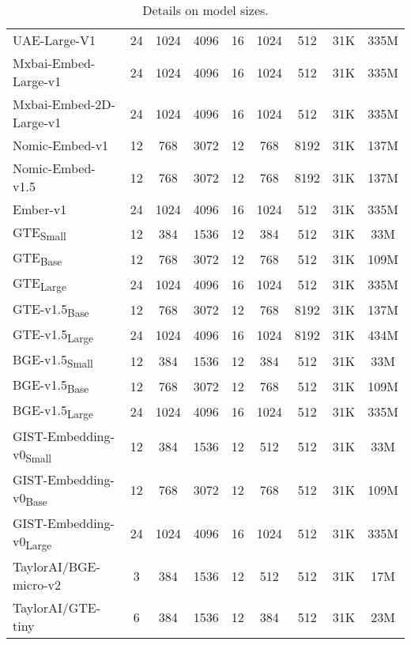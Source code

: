 \begin{table*}[ht!]
\begin{tabular}{lcccccccc}
    UAE-Large-V1 & 24 & 1024 & 4096 & 16 & 1024 & 512 & 31K & 335M \\
    Mxbai-Embed-Large-v1 & 24 & 1024 & 4096 & 16 & 1024 & 512 & 31K & 335M \\
    Mxbai-Embed-2D-Large-v1 & 24 & 1024 & 4096 & 16 & 1024 & 512 & 31K & 335M \\
    Nomic-Embed-v1 & 12 & 768 & 3072 & 12 & 768 & 8192 & 31K & 137M \\
    Nomic-Embed-v1.5 & 12 & 768 & 3072 & 12 & 768 & 8192 & 31K & 137M \\
    Ember-v1 & 24 & 1024 & 4096 & 16 & 1024 & 512 & 31K & 335M \\
    GTE\textsubscript{Small} & 12 & 384 & 1536 & 12 & 384 & 512 & 31K & 33M \\
    GTE\textsubscript{Base} & 12 & 768 & 3072 & 12 & 768 & 512 & 31K & 109M \\
    GTE\textsubscript{Large} & 24 & 1024 & 4096 & 16 & 1024 & 512 & 31K & 335M \\
    GTE-v1.5\textsubscript{Base} & 12 & 768 & 3072 & 12 & 768 & 8192 & 31K & 137M \\
    GTE-v1.5\textsubscript{Large} & 24 & 1024 & 4096 & 16 & 1024 & 8192 & 31K & 434M \\
    BGE-v1.5\textsubscript{Small} & 12 & 384 & 1536 & 12 & 384 & 512 & 31K & 33M \\
    BGE-v1.5\textsubscript{Base} & 12 & 768 & 3072 & 12 & 768 & 512 & 31K & 109M \\
    BGE-v1.5\textsubscript{Large} & 24 & 1024 & 4096 & 16 & 1024 & 512 & 31K & 335M \\
    GIST-Embedding-v0\textsubscript{Small} & 12 & 384 & 1536 & 12 & 512 & 512 & 31K & 33M \\
    GIST-Embedding-v0\textsubscript{Base}  & 12 & 768 & 3072 & 12 & 768 & 512 & 31K & 109M \\
    GIST-Embedding-v0\textsubscript{Large} & 24 & 1024 & 4096 & 16 & 1024 & 512 & 31K & 335M \\
    TaylorAI/BGE-micro-v2 & 3 & 384 & 1536 & 12 & 512 & 512 & 31K & 17M \\
    TaylorAI/GTE-tiny & 6 & 384 & 1536 & 12 & 384 & 512 & 31K & 23M \\
    \bottomrule
  \end{tabular}
  \caption{Details on model sizes.}
  \label{tab:parameters}
\end{table*}
  